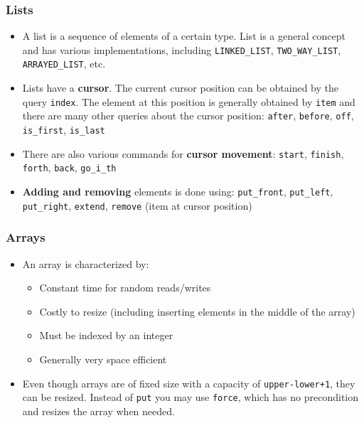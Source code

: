 \documentclass[a4paper]{article}
\newcommand{\inline}[1]{\lstinline!#1!}%
\begin{document}
\subsubsection{Lists}
\begin{itemize}
\item A list is a sequence of elements of a certain type. List is a general concept and has various implementations, including \inline{LINKED_LIST}, \inline{TWO_WAY_LIST}, \inline{ARRAYED_LIST}, etc.
\item Lists have a \textbf{cursor}. The current cursor position can be obtained by the query \inline{index}. The element at this position is generally obtained by \inline{item} and there are many other queries about the cursor position: \inline{after}, \inline{before}, \inline{off}, \inline{is_first}, \inline{is_last}
\item There are also various commands for \textbf{cursor movement}: \inline{start}, \inline{finish}, \inline{forth}, \inline{back}, \inline{go_i_th}
\item \textbf{Adding and removing} elements is done using: \inline{put_front}, \inline{put_left}, \inline{put_right}, \inline{extend}, \inline{remove} (item at cursor position)
\end{itemize}
\subsubsection{Arrays}
\begin{itemize}
\item An array is characterized by:
\begin{itemize}
\item Constant time for random reads/writes
\item Costly to resize (including inserting elements in the middle of the array)
\item Must be indexed by an integer
\item Generally very space efficient
\end{itemize}
\item Even though arrays are of fixed size with a capacity of \inline{upper-lower+1}, they can be resized. Instead of \inline{put} you may use \inline{force}, which has no precondition and resizes the array when needed.
\end{itemize}
\end{document}
